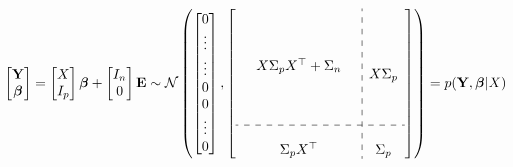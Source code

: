 \begin{gather}
    \begin{bmatrix}
        \mathbf{Y} \\
        \boldsymbol{\beta}
    \end{bmatrix}
    = \begin{bmatrix} X \\ I_p \end{bmatrix} \boldsymbol{\beta} + \begin{bmatrix} I_n \\ 0 \end{bmatrix}  \mathbf{E}
    \sim \N \left(
        \begin{bmatrix}
        0 \\
        \vdots \\
        \vdots \\
        0 \\
        0 \\
        \vdots \\
        0
        \end{bmatrix},
        \left[
        \begin{array}{ c:c c c }
            \begin{matrix}
                & & \\
                & & \\
                & & \\
                & X \Sigma_p X^{\top} + \Sigma_n & \\
                & & \\
                & & \\
                & & \\
            \end{matrix}
            & \begin{matrix} \\ \\ \\ X \Sigma_p  \\ \\ \\ \end{matrix} \\
            \hdashline \\
            \begin{matrix} &  \Sigma_p X^{\top} & \end{matrix} & \Sigma_p
        \end{array}
        \right]
        \right)
    = p(\mathbf{Y}, \boldsymbol{\beta} | X)
\end{gather}


